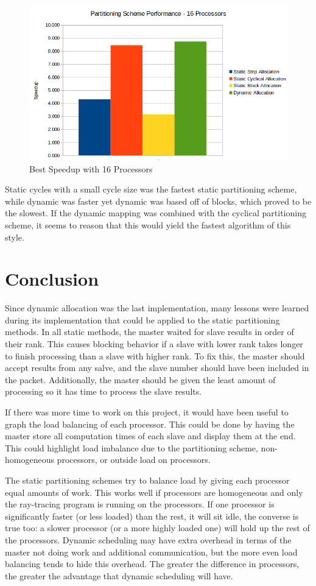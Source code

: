 \documentclass[11pt]{article}
\begin{document}
		\begin{figure}[H]
			\centering
			\includegraphics[width=0.7\linewidth]{Pictures/Comparison}
			\caption{Best Speedup with 16 Processors}
			\label{fig:comparison}
		\end{figure}
	
		Static cycles with a small cycle size was the fastest static partitioning scheme, while dynamic was faster yet dynamic was based off of blocks, which proved to be the slowest. If the dynamic mapping was combined with the cyclical partitioning scheme, it seems to reason that this would yield the fastest algorithm of this style.

\section{Conclusion}

	Since dynamic allocation was the last implementation, many lessons were learned during its implementation that could be applied to the static partitioning methods. In all static methods, the master waited for slave results in order of their rank. This causes blocking behavior if a slave with lower rank takes longer to finish processing than a slave with higher rank. To fix this, the master should accept results from any salve, and the slave number should have been included in the packet. Additionally, the master should be given the least amount of processing so it has time to process the slave results. 
	
	If there was more time to work on this project, it would have been useful to graph the load balancing of each processor. This could be done by having the master store all computation times of each slave and display them at the end. This could highlight load imbalance due to the partitioning scheme, non-homogeneous processors, or outside load on processors. 

	The static partitioning schemes try to balance load by giving each processor equal amounts of work. This works well if processors are homogeneous and only the ray-tracing program is running on the processors. If one processor is significantly faster (or less loaded) than the rest, it will sit idle, the converse is true too: a slower processor (or a more highly loaded one) will hold up the rest of the processors. Dynamic scheduling may have extra overhead in terms of the master not doing work and additional communication, but the more even load balancing tends to hide this overhead. The greater the difference in processors, the greater the advantage that dynamic scheduling will have.
	
\end{document}
